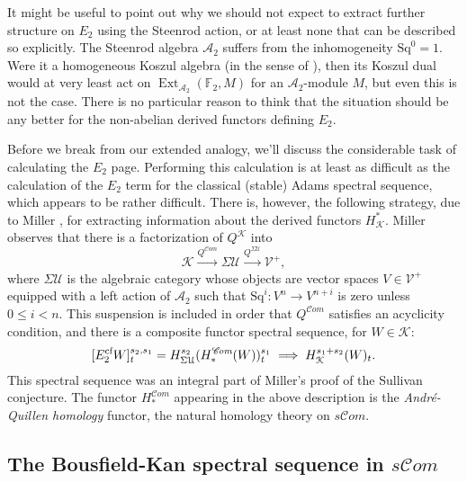 \documentclass[11pt]{amsart} \renewcommand{\baselinestretch}{1.4}
\theoremstyle{plain}
\theoremstyle{definition}
\DeclareMathOperator{\Ext}{Ext}
\renewcommand{\to}{\longrightarrow}
\newcommand{\scrC}{\mathscr{C}}
\newcommand{\calV}{\mathcal{V}}
\newcommand{\calu}{\mathcal{U}}
\newcommand{\cala}{\mathcal{A}}
\newcommand{\calk}{\mathcal{K}}
\newcommand{\vect}[2]{\calV^{#1}_{#2}}
\newcommand{\Sq}{\mathrm{Sq}}
\newcommand{\F}{\mathbb{F}}
\newcommand{\algs}{{\scrC\!\textit{om}}}
\newcommand{\Ftwo}{\F_2}
\newcommand{\E}[5]{[E^{#1}_{#2}#3]^{#4}_{#5}}
\begin{document}
\begin{Introduction}
It might be useful to point out why we should not expect to extract further structure on $E_2$ using the Steenrod action, or at least none that can be described so explicitly. The Steenrod algebra $\cala_2$ suffers from the inhomogeneity $\Sq^0=1$. Were it a homogeneous Koszul algebra (in the sense of \cite{PriddyKoszul.pdf}), then its Koszul dual would at very least act on $\Ext_{\cala_2}(\Ftwo,M)$ for an $\cala_2$-module $M$, but even this is not the case. 
There is no particular reason to think that the situation should be any better for the non-abelian derived functors defining $E_2$.

Before we break from our extended analogy, we'll discuss the considerable task of calculating the $E_2$ page. Performing this calculation is at least as difficult as the calculation of the $E_2$ term for the classical (stable) Adams spectral sequence, which appears to be rather difficult. There is, however, the following strategy, due to Miller \cite{MillerSullivanConjecture.pdf}, for extracting information about the derived functors $H^*_{\calk}$. Miller  observes that there is a factorization of $Q^{\calk}$ into 
\[\calk\overset{Q^{\algs}}{\to} \Sigma\calu \overset{Q^{\Sigma\calu}}{\to}\vect{+}{},\]
where $\Sigma\calu$ is the algebraic category whose objects are vector spaces $V\in\vect{+}{}$ equipped with a left action of $\cala_2$ such that $\Sq^i:V^n\to V^{n+i}$ is zero unless $0\leq i <n$.
This suspension is included in order that $Q^\algs$ satisfies an acyclicity condition, and  there is a composite functor spectral sequence, for $W\in\calk$:
\[\E{\textup{cf}}{2}{W}{s_2,s_1}{t}=H^{s_2}_{\Sigma\calu}(H_*^{\algs}(W))^{s_1}_t\implies H^{s_1+s_2}_\calk (W)_t.\]
This spectral sequence was an integral part of Miller's proof of the Sullivan conjecture. The functor $H_*^{\algs}$ appearing in the above description is the \emph{Andr\'e-Quillen  homology} functor, the natural homology theory on $s\algs$. 
\subsection{The Bousfield-Kan spectral sequence in $s\algs$}


\end{Introduction}
\end{document}
